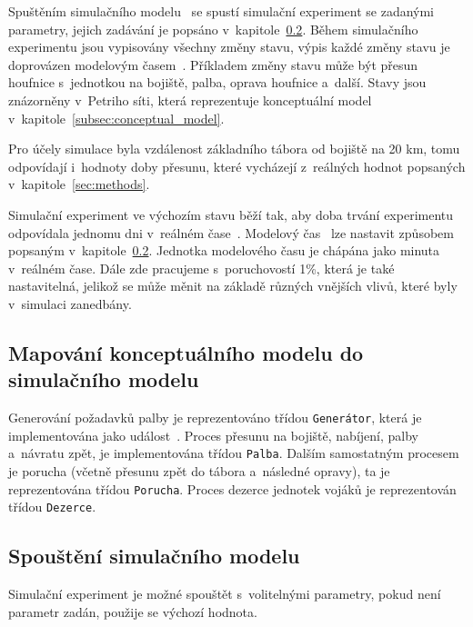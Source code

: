 \documentclass[a4paper]{article}
\begin{document}
        Spuštěním simulačního modelu~\cite[snímek 44]{IMS_slides} se spustí simulační experiment se zadanými parametry,
        jejich zadávání je popsáno v~kapitole~\ref{subsec:start}. Během simulačního experimentu jsou vypisovány všechny změny stavu,
        výpis každé změny stavu je doprovázen modelovým časem~\cite[snímek 21]{IMS_slides}. Příkladem změny stavu může být
        přesun houfnice s~jednotkou na bojiště, palba, oprava houfnice a~další. Stavy jsou znázorněny v~Petriho síti,
        která reprezentuje konceptuální model v~kapitole~\ref{subsec:conceptual_model}.

        Pro účely simulace byla vzdálenost základního tábora od bojiště na 20 km, tomu odpovídají i~hodnoty doby přesunu,
        které vycházejí z~reálných hodnot popsaných v~kapitole~\ref{sec:methods}.

        Simulační experiment ve výchozím stavu běží tak, aby doba trvání experimentu odpovídala jednomu dni v~reálném čase~\cite[snímek 21]{IMS_slides}.
        Modelový čas~\cite[snímek 21]{IMS_slides} lze nastavit způsobem popsaným v~kapitole~\ref{subsec:start}. Jednotka modelového času je chápána jako
        minuta v~reálném čase.
        Dále zde pracujeme s~poruchovostí 1\%, která je také nastavitelná, jelikož se může měnit na základě různých vnějších vlivů, které byly v~simulaci zanedbány.

        \subsection{Mapování konceptuálního modelu do simulačního modelu}
        \label{subsec:mapping}

            Generování požadavků palby je reprezentováno třídou \texttt{Generátor}, která je implementována jako
            událost~\cite[snímek 169]{IMS_slides}. Proces přesunu na bojiště, nabíjení, palby a~návratu zpět, je 
            implementována třídou \texttt{Palba}. Dalším samostatným procesem je porucha (včetně přesunu zpět do tábora a~následné opravy),
            ta je reprezentována třídou \texttt{Porucha}. Proces dezerce jednotek vojáků je reprezentován třídou \texttt{Dezerce}.

        \subsection{Spouštění simulačního modelu}
        \label{subsec:start}

            Simulační experiment je možné spouštět s~volitelnými parametry, pokud není parametr zadán, použije se výchozí hodnota.
            
\end{document}
